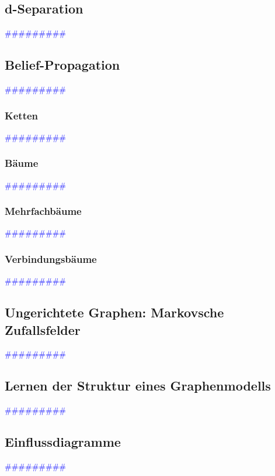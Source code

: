 \documentclass{article}
\begin{document}
  \subsection{d-Separation} %
      \textcolor{blue}{\#\#\#\#\#\#\#\#\#}
  \subsection{Belief-Propagation} %
      \textcolor{blue}{\#\#\#\#\#\#\#\#\#}
    \subsubsection{Ketten} %
      \textcolor{blue}{\#\#\#\#\#\#\#\#\#}
    \subsubsection{Bäume} %
      \textcolor{blue}{\#\#\#\#\#\#\#\#\#}
    \subsubsection{Mehrfachbäume} %
      \textcolor{blue}{\#\#\#\#\#\#\#\#\#}
    \subsubsection{Verbindungsbäume} %
      \textcolor{blue}{\#\#\#\#\#\#\#\#\#}
  \subsection{Ungerichtete Graphen: Markovsche Zufallsfelder} %
      \textcolor{blue}{\#\#\#\#\#\#\#\#\#}
  \subsection{Lernen der Struktur eines Graphenmodells} %
      \textcolor{blue}{\#\#\#\#\#\#\#\#\#}
  \subsection{Einflussdiagramme} %
      \textcolor{blue}{\#\#\#\#\#\#\#\#\#}
\end{document}
